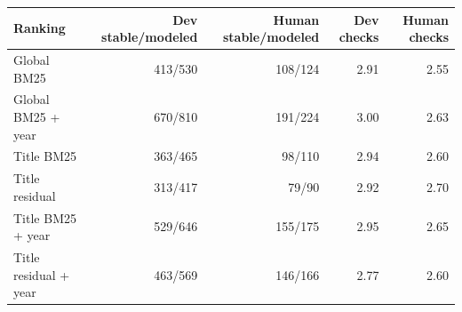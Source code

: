\begin{tabular}{lrrrr}
\toprule
Ranking & Dev stable/modeled & Human stable/modeled & Dev checks & Human checks \\
\midrule
Global BM25 & 413/530 & 108/124 & 2.91 & 2.55 \\
Global BM25 + year & 670/810 & 191/224 & 3.00 & 2.63 \\
Title BM25 & 363/465 & 98/110 & 2.94 & 2.60 \\
Title residual & 313/417 & 79/90 & 2.92 & 2.70 \\
Title BM25 + year & 529/646 & 155/175 & 2.95 & 2.65 \\
Title residual + year & 463/569 & 146/166 & 2.77 & 2.60 \\
\bottomrule
\end{tabular}
